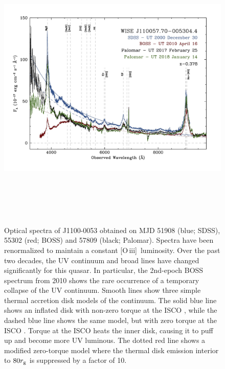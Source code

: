 \documentclass{nature}
\newcommand{\oiii}{[O\,{\sc iii}]\ }
\begin{document}
\begin{figure}
  \centering
  \includegraphics[width=17.00cm, height=14.00cm, trim=0.0cm 0.0cm 0.0cm 0.0cm, clip]
  {../plots/spectra/w1100m0053_sdss_palomar2.jpg}
  \caption[]{Optical spectra of J1100-0053 obtained on MJD 51908 (blue; SDSS), 55302 (red; BOSS) and 57809 (black; Palomar).  Spectra have been renormalized to maintain a constant \oiii luminosity. Over the past two decades, the UV continuum and broad lines have changed significantly for this quasar.  In particular, the 2nd-epoch BOSS spectrum from 2010 shows the rare occurrence of a temporary collapse of the UV continuum.  Smooth lines show three simple thermal accretion disk models of the continuum.  The solid blue line shows an inflated disk with non-zero torque at the ISCO \cite[e.g.,][]{Sirko_Goodman2003}, while the dashed blue line shows the same model, but with zero torque at the ISCO \cite[i.e., a simple $\alpha$-disk model,][]{SS73}.  Torque at the ISCO heats the inner disk, causing it to puff up and become more UV luminous.  The dotted red line shows a modified zero-torque model where the thermal disk emission interior to $80 r_{\rm g}$ is suppressed by a factor of 10. }
  \label{fig:J110057_spectra}
\end{figure}
\end{document}
